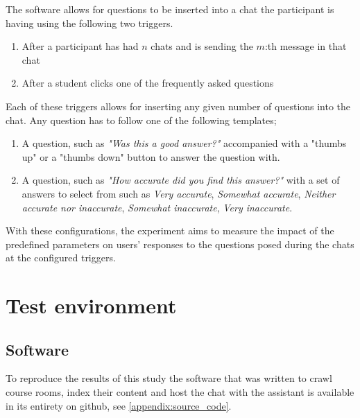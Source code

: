 The software allows for questions to be inserted into a chat the participant is having using the following two triggers.


\begin{enumerate}
        \item After a participant has had $n$ chats and is sending the $m$:th message in that chat
        \item After a student clicks one of the frequently asked questions
\end{enumerate}


Each of these triggers allows for inserting any given number of questions into the chat. Any question has to follow one of the following templates;


\begin{enumerate}[label=\alph*)]
        \item A question, such as \textit{"Was this a good answer?"} accompanied with a "thumbs up" or a "thumbs down" button to answer the question with.
        \item A question, such as \textit{"How accurate did you find this answer?"} with a set of answers to select from such as \textit{Very accurate}, \textit{Somewhat accurate}, \textit{Neither accurate nor inaccurate}, \textit{Somewhat inaccurate}, \textit{Very inaccurate}.
\end{enumerate}


With these configurations, the experiment aims to measure the impact of the predefined parameters on users' responses to the questions posed during the chats at the configured triggers.


\section{Test environment}




\subsection{Software}


To reproduce the results of this study the software that was written to crawl course rooms, index their content and host the chat with the assistant is available in its entirety on github, see \autoref{appendix:source_code}.


